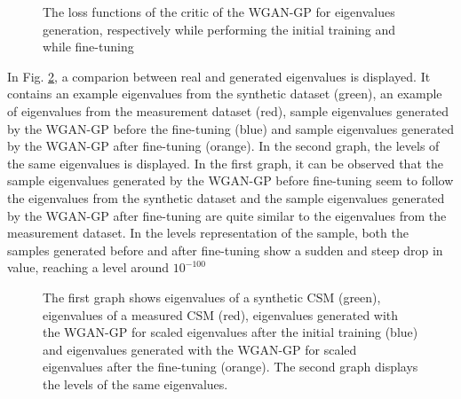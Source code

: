 \documentclass[11pt,a4paper,twoside]{report}
\begin{document}
\begin{figure}
    \centering
    \caption{The loss functions of the critic of the WGAN-GP for eigenvalues generation, respectively while performing the initial training and while fine-tuning}
    \label{fig:loss_evals_wgangp}
\end{figure}

In Fig. \ref{fig:samples_evals_wgangp}, a comparion between real and generated eigenvalues is displayed. It contains an example eigenvalues from the synthetic dataset (green), an example of eigenvalues from the measurement dataset (red), sample eigenvalues generated by the WGAN-GP before the fine-tuning (blue) and sample eigenvalues generated by the WGAN-GP after fine-tuning (orange). In the second graph, the levels of the same eigenvalues is displayed. In the first graph, it can be observed that the sample eigenvalues generated by the WGAN-GP before fine-tuning seem to follow the eigenvalues from the synthetic dataset and the sample eigenvalues generated by the WGAN-GP after fine-tuning are quite similar to the eigenvalues from the measurement dataset. In the levels representation of the sample, both the samples generated before and after fine-tuning show a sudden and steep drop in value, reaching a level around $10^{-100}$

\begin{figure}
    \centering
    \caption{The first graph shows eigenvalues of a synthetic CSM (green), eigenvalues of a measured CSM (red), eigenvalues generated with the WGAN-GP for scaled eigenvalues after the initial training (blue) and eigenvalues generated with the WGAN-GP for scaled eigenvalues after the fine-tuning (orange). The second graph displays the levels of the same eigenvalues.}
    \label{fig:samples_evals_wgangp}
\end{figure}
\end{document}
